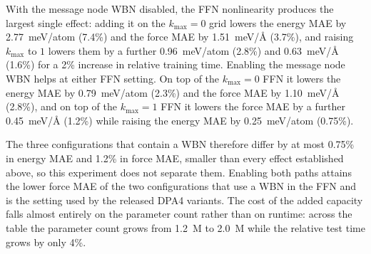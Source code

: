 With the message node WBN disabled, the FFN nonlinearity produces the largest single effect: adding it on the $k_{\max}=0$ grid lowers the energy MAE by 2.77~meV/atom (7.4\%) and the force MAE by 1.51~meV/\AA{} (3.7\%), and raising $k_{\max}$ to $1$ lowers them by a further 0.96~meV/atom (2.8\%) and 0.63~meV/\AA{} (1.6\%) for a 2\% increase in relative training time.
Enabling the message node WBN helps at either FFN setting.
On top of the $k_{\max}=0$ FFN it lowers the energy MAE by 0.79~meV/atom (2.3\%) and the force MAE by 1.10~meV/\AA{} (2.8\%), and on top of the $k_{\max}=1$ FFN it lowers the force MAE by a further 0.45~meV/\AA{} (1.2\%) while raising the energy MAE by 0.25~meV/atom (0.75\%).

The three configurations that contain a WBN therefore differ by at most 0.75\% in energy MAE and 1.2\% in force MAE, smaller than every effect established above, so this experiment does not separate them.
Enabling both paths attains the lower force MAE of the two configurations that use a WBN in the FFN and is the setting used by the released DPA4 variants.
The cost of the added capacity falls almost entirely on the parameter count rather than on runtime: across the table the parameter count grows from 1.2~M to 2.0~M while the relative test time grows by only 4\%.

